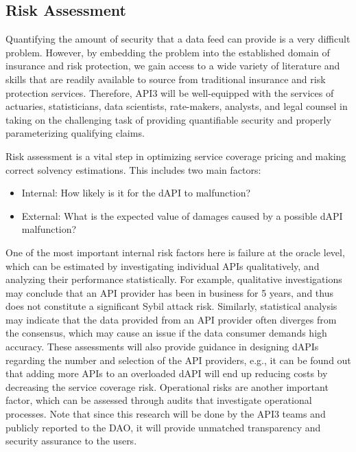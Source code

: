 \documentclass[11pt]{article}
\begin{document}
\subsection{Risk Assessment}
\label{sec:risk-assessment}

Quantifying the amount of security that a data feed can provide is a very difficult problem.
However, by embedding the problem into the established domain of insurance and risk protection, we gain access to a wide variety of literature and skills that are readily available to source from traditional insurance and risk protection services.
Therefore, API3 will be well-equipped with the services of actuaries, statisticians, data scientists, rate-makers, analysts, and legal counsel in taking on the challenging task of providing quantifiable security and properly parameterizing qualifying claims.

Risk assessment is a vital step in optimizing service coverage pricing and making correct solvency estimations.
This includes two main factors:
\begin{itemize}
    \item Internal: How likely is it for the dAPI to malfunction?
    \item External: What is the expected value of damages caused by a possible dAPI malfunction?
\end{itemize}

One of the most important internal risk factors here is failure at the oracle level, which can be estimated by investigating individual APIs qualitatively, and analyzing their performance statistically.
For example, qualitative investigations may conclude that an API provider has been in business for 5 years, and thus does not constitute a significant Sybil attack risk.
Similarly, statistical analysis may indicate that the data provided from an API provider often diverges from the consensus, which may cause an issue if the data consumer demands high accuracy.
These assessments will also provide guidance in designing dAPIs regarding the number and selection of the API providers, e.g., it can be found out that adding more APIs to an overloaded dAPI will end up reducing costs by decreasing the service coverage risk.
Operational risks are another important factor, which can be assessed through audits that investigate operational processes.
Note that since this research will be done by the API3 teams and publicly reported to the DAO, it will provide unmatched transparency and security assurance to the users.
\end{document}
